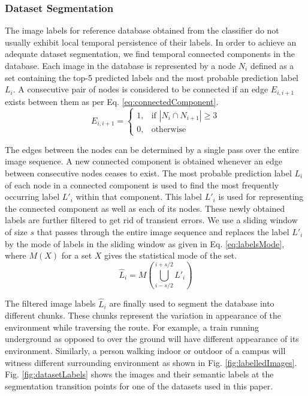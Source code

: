 \documentclass[letterpaper, 10 pt, conference]{ieeeconf}  %
\begin{document}
\subsubsection{Dataset Segmentation}
The image labels for reference database obtained from the classifier do not usually exhibit local temporal persistence of their labels. In order to achieve an adequate dataset segmentation, we find temporal connected components in the database. Each image in the database is represented by a node $N_i$ defined as a set containing the top-5 predicted labels and the most probable prediction label $L_i$. A consecutive pair of nodes is considered to be connected if an edge $E_{i,i+1}$ exists between them as per Eq. \ref{eq:connectedComponent}.
\begin{equation}
 E_{i,i+1} = 
 \begin{cases}
  1, & \text{if } \left\vert{N_i \cap N_{i+1}}\right\vert \geq 3\\
  0, & \text{otherwise}
 \end{cases}
 \label{eq:connectedComponent}
\end{equation}

The edges between the nodes can be determined by a single pass over the entire image sequence. A new connected component is obtained whenever an edge between consecutive nodes ceases to exist. The most probable prediction label $L_i$ of each node in a connected component is used to find the most frequently occurring label $L'_i$ within that component. This label $L'_i$ is used for representing the connected component as well as each of its nodes. These newly obtained labels are further filtered to get rid of transient errors. We use a sliding window of size $s$ that passes through the entire image sequence and replaces the label $L'_i$ by the mode of labels in the sliding window as given in Eq. \ref{eq:labelsMode}, where $M(X)$ for a set $X$ gives the statistical mode of the set.
\begin{equation}
 \hat{L}_i = M(\bigcup\limits_{i-s/2}^{i+s/2} L'_i)
 \label{eq:labelsMode}
\end{equation}

The filtered image labels $\hat{L}_i$ are finally used to segment the database into different chunks. These chunks represent the variation in appearance of the environment while traversing the route. For example, a train running underground as opposed to over the ground will have different appearance of its environment. Similarly, a person walking indoor or outdoor of a campus will witness different surrounding environment as shown in Fig. \ref{fig:labelledImages}. Fig. \ref{fig:datasetLabels} shows the images and their semantic labels at the segmentation transition points for one of the datasets used in this paper.
\end{document}
